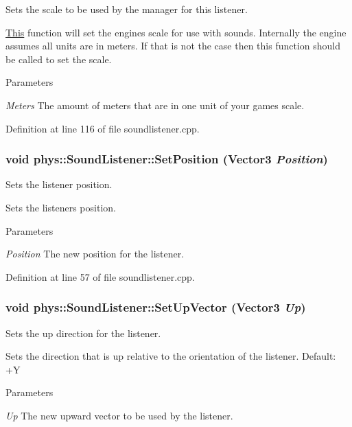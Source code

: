 Sets the scale to be used by the manager for this listener. 

\hyperlink{structThis}{This} function will set the engines scale for use with sounds. Internally the engine assumes all units are in meters. If that is not the case then this function should be called to set the scale. 
\begin{DoxyParams}{Parameters}
\item[{\em Meters}]The amount of meters that are in one unit of your games scale. \end{DoxyParams}


Definition at line 116 of file soundlistener.cpp.

\hypertarget{classphys_1_1SoundListener_ab2a679aaf18c646365285c8691ffcb0c}{
\subsubsection[{SetPosition}]{\setlength{\rightskip}{0pt plus 5cm}void phys::SoundListener::SetPosition ({\bf Vector3} {\em Position})}}
\label{d1/d5a/classphys_1_1SoundListener_ab2a679aaf18c646365285c8691ffcb0c}


Sets the listener position. 

Sets the listeners position. 
\begin{DoxyParams}{Parameters}
\item[{\em Position}]The new position for the listener. \end{DoxyParams}


Definition at line 57 of file soundlistener.cpp.

\hypertarget{classphys_1_1SoundListener_a51d6f4ccbbbe059e330eba6ef218eda8}{
\subsubsection[{SetUpVector}]{\setlength{\rightskip}{0pt plus 5cm}void phys::SoundListener::SetUpVector ({\bf Vector3} {\em Up})}}
\label{d1/d5a/classphys_1_1SoundListener_a51d6f4ccbbbe059e330eba6ef218eda8}


Sets the up direction for the listener. 

Sets the direction that is up relative to the orientation of the listener. Default: +Y 
\begin{DoxyParams}{Parameters}
\item[{\em Up}]The new upward vector to be used by the listener. \end{DoxyParams}


